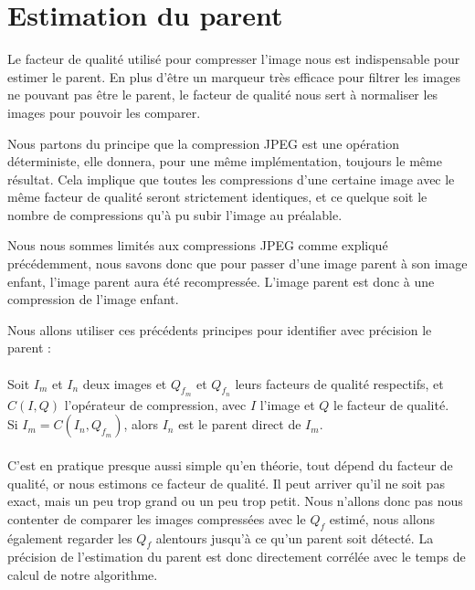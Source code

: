 \documentclass[utf8,final]{stageM2R} %
\begin{document}
\section{Estimation du parent}
\label{sec:parent}
Le facteur de qualité utilisé pour compresser l'image nous est indispensable pour estimer le parent. En plus d'être un marqueur très efficace pour filtrer les images ne pouvant pas être le parent, le facteur de qualité nous sert à normaliser les images pour pouvoir les comparer.

Nous partons du principe que la compression JPEG est une opération déterministe, elle donnera, pour une même implémentation, toujours le même résultat. Cela implique que toutes les compressions d'une certaine image avec le même facteur de qualité seront strictement identiques, et ce quelque soit le nombre de compressions qu'à pu subir l'image au préalable.

Nous nous sommes limités aux compressions JPEG comme expliqué précédemment, nous savons donc que pour passer d'une image parent à son image enfant, l'image parent aura été recompressée. L'image parent est donc à une compression de l'image enfant.

Nous allons utiliser ces précédents principes pour identifier avec précision le parent : 
\paragraph{}

Soit $I_m$ et $I_n$ deux images et $Q_{f_{m}}$ et $Q_{f_{n}}$ leurs facteurs de qualité respectifs, et $C(I,Q)$ l'opérateur de compression, avec $I$ l'image et $Q$ le facteur de qualité.
\\
Si $I_m = C(I_n, Q_{f_{m}})$, alors $I_n$ est le parent direct de $I_m$.
\paragraph{}

C'est en pratique presque aussi simple qu'en théorie, tout dépend du facteur de qualité, or nous estimons ce facteur de qualité. Il peut arriver qu'il ne soit pas exact, mais un peu trop grand ou un peu trop petit. Nous n'allons donc pas nous contenter de comparer les images compressées avec le $Q_f$ estimé, nous allons également regarder les $Q_f$ alentours jusqu'à ce qu'un parent soit détecté. La précision de l'estimation du parent est donc directement corrélée avec le temps de calcul de notre algorithme. 

\end{document}
